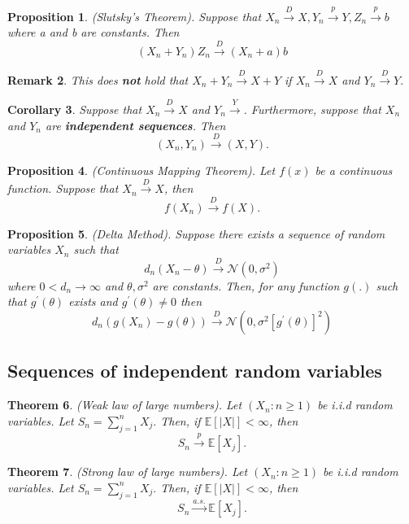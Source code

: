 \documentclass[twoside]{article}
\newcounter{lecnum}
\newtheorem{theorem}{Theorem}[lecnum]
\newtheorem{proposition}[theorem]{Proposition}
\newtheorem{corollary}[theorem]{Corollary}
\newtheorem{remark}[theorem]{Remark}
\begin{document}
\begin{proposition}(Slutsky's Theorem). Suppose that $X_n \xrightarrow{D} X, Y_n \xrightarrow{p} Y, Z_n \xrightarrow{p} b$ where a and b are constants. Then 
$$
(X_n + Y_n)Z_n \xrightarrow{D} (X_n + a)b
$$
\end{proposition}

\begin{remark} This does \textbf{not} hold that $X_n + Y_n \xrightarrow{D} X + Y$ if $X_n \xrightarrow{D} X$ and $Y_n \xrightarrow{D} Y.$
\end{remark}

\begin{corollary} Suppose that $X_n \xrightarrow{D} X$ and $Y_n \xrightarrow Y$. Furthermore, suppose that $X_n$ and $Y_n$ are \textbf{independent sequences}. Then 
$$
(X_n, Y_n) \xrightarrow{D} (X, Y).
$$
\end{corollary}

\begin{proposition}(Continuous Mapping Theorem). Let $f(x)$ be a continuous function. Suppose that $X_n \xrightarrow{D} X$, then 
$$
f(X_n) \xrightarrow{D} f(X).
$$
\end{proposition}

\begin{proposition}(Delta Method). Suppose there exists a sequence of random variables $X_n$ such that 
$$
d_n(X_n - \theta) \xrightarrow{D} \mathcal{N}(0, \sigma^2)
$$
where $0 < d_n \rightarrow \infty$ and $\theta, \sigma^2$ are constants. Then, for any function $g(.)$ such that $g^{'}(\theta)$ exists and $g^{'}(\theta) \neq 0$ then 
$$
d_n(g(X_n) - g(\theta)) \xrightarrow{D} \mathcal{N}(0, \sigma^2 [g^{'}(\theta)]^2)
$$
\end{proposition}

\subsection{Sequences of independent random variables}

\begin{theorem}(Weak law of large numbers). Let $(X_n: n \geq 1)$ be i.i.d random variables. Let $S_n = \sum_{j=1}^{n}X_j.$ Then, if $\mathbb{E}[|X|] < \infty$, then 
$$
S_n \xrightarrow{p} \mathbb{E}[X_j].
$$
\end{theorem}

\begin{theorem}(Strong law of large numbers). Let $(X_n: n \geq 1)$ be i.i.d random variables. Let $S_n = \sum_{j=1}^{n}X_j.$ Then, if $\mathbb{E}[|X|] < \infty$, then 
$$
S_n \xrightarrow{a.s.} \mathbb{E}[X_j].
$$
\end{theorem}
\end{document}
